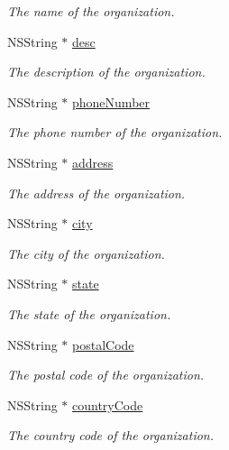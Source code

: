 \begin{DoxyCompactItemize}
\begin{DoxyCompactList}\small\item\em The name of the organization. \end{DoxyCompactList}\item 
N\+S\+String $\ast$ \hyperlink{class_x_i_organization_info_a7399ceb64f7a53eb710b6ed044111d03}{desc}
\begin{DoxyCompactList}\small\item\em The description of the organization. \end{DoxyCompactList}\item 
N\+S\+String $\ast$ \hyperlink{class_x_i_organization_info_a673bbb419464ed3fd0dcd757a291b1a4}{phone\+Number}
\begin{DoxyCompactList}\small\item\em The phone number of the organization. \end{DoxyCompactList}\item 
N\+S\+String $\ast$ \hyperlink{class_x_i_organization_info_a9a6f2db2d2525929d9950866f407247b}{address}
\begin{DoxyCompactList}\small\item\em The address of the organization. \end{DoxyCompactList}\item 
N\+S\+String $\ast$ \hyperlink{class_x_i_organization_info_ab31da34e4e82f33656a8959ef499a9cb}{city}
\begin{DoxyCompactList}\small\item\em The city of the organization. \end{DoxyCompactList}\item 
N\+S\+String $\ast$ \hyperlink{class_x_i_organization_info_a8e312871866c60905af3c614e72a221b}{state}
\begin{DoxyCompactList}\small\item\em The state of the organization. \end{DoxyCompactList}\item 
N\+S\+String $\ast$ \hyperlink{class_x_i_organization_info_a6383de899ad410f0124af3d0967a7e9e}{postal\+Code}
\begin{DoxyCompactList}\small\item\em The postal code of the organization. \end{DoxyCompactList}\item 
N\+S\+String $\ast$ \hyperlink{class_x_i_organization_info_aa102d8963d3c01457a38f955ab52886b}{country\+Code}
\begin{DoxyCompactList}\small\item\em The country code of the organization. \end{DoxyCompactList}\item 

\end{DoxyCompactItemize}
